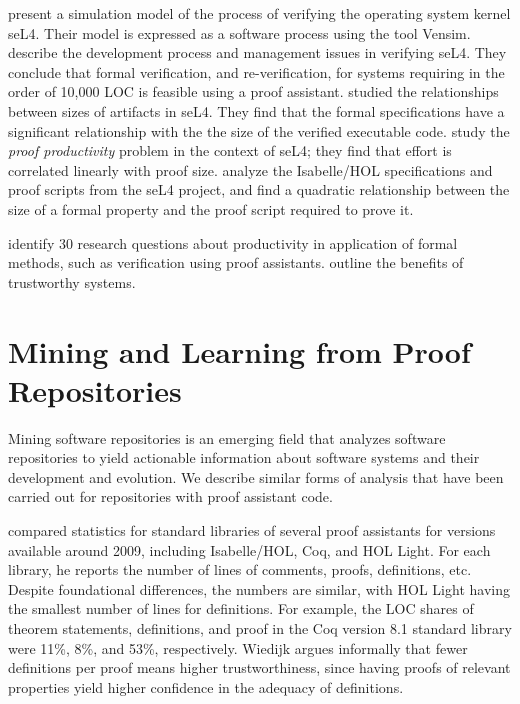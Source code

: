 \cite{Zhang2012} present a simulation model of the process of verifying the operating system kernel seL4. Their model is expressed as a software process using the tool Vensim. \cite{Andronick2012} describe the development process and management issues in verifying seL4. They conclude that formal verification, and re-verification, for systems requiring in the order of 10,000 LOC is feasible using a proof assistant. \cite{Staples2013} studied the relationships between sizes of artifacts in seL4. They find that the formal specifications have a significant relationship with the the size of the verified executable code. \cite{Staples2014} study the \emph{proof productivity} problem in the context of seL4; they find that effort is correlated linearly with proof size. \cite{Matichuk2015} analyze the Isabelle/HOL specifications and proof scripts from the seL4 project, and find a quadratic relationship between the size of a formal property and the proof script required to prove it.

\cite{Jeffery2015} identify 30 research questions about productivity in application of formal methods, such as verification using proof assistants. \cite{Klein2015} outline the benefits of trustworthy systems.

\section{Mining and Learning from Proof Repositories}
\label{sec:mining}

Mining software repositories is an emerging field that analyzes software repositories to yield actionable information about software systems and their development and evolution. We describe similar forms of analysis that have been carried out for repositories with proof assistant code.

\cite{Wiedijk2009} compared statistics for standard libraries of several proof assistants for versions available around 2009, including Isabelle/HOL, Coq, and HOL Light. For each library, he reports the number of lines of comments, proofs, definitions, etc. Despite foundational differences, the numbers are similar, with HOL Light having the smallest number of lines for definitions. For example, the LOC shares of theorem statements, definitions, and proof in the Coq version 8.1 standard library were 11\%, 8\%, and 53\%, respectively. Wiedijk argues informally that fewer definitions per proof means higher trustworthiness, since having proofs of relevant properties yield higher confidence in the adequacy of definitions.

